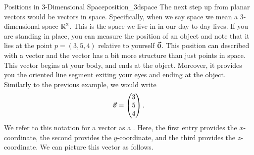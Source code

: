         
        \begin{ex}{Positions in 3-Dimensional Space}{position_3dspace}
        The next step up from planar vectors would be vectors in space. Specifically, when we say space we mean a 3-dimensional space $\mathbb{R}^3$.  This is the space we live in in our day to day lives. If you are standing in place, you can measure the position of an object and note that it lies at the point $p=(3,5,4)$ relative to yourself $\boldsymbol{\vec{0}}$. This position can described  with a vector and the vector has a bit more structure than just points in space.  This vector begins at your body, and ends at the object. Moreover, it provides you the oriented line segment exiting your eyes and ending at the object. Similarly to the previous example, we would write
        \[
        \boldsymbol{\boldsymbol{\vec{v}}} = \begin{pmatrix} 3 \\ 5 \\ 4 \end{pmatrix}.
        \]
        We refer to this notation for a vector as a . Here, the first entry provides the $x$-coordinate, the second provides the $y$-coordinate, and the third provides the $z$-coordinate. We can picture this vector as follows.
        
        
\begin{center}
\end{center}


\end{ex}
